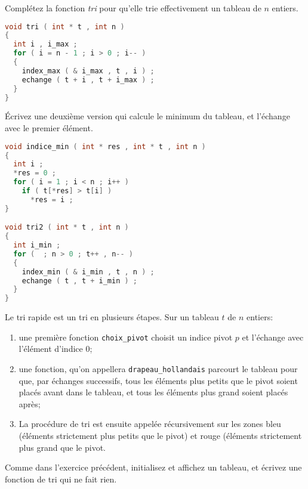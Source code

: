 \question Complétez la fonction \emph{tri} pour qu'elle trie
effectivement un tableau de \(n\) entiers.

\begin{solution}
  \begin{lstlisting}[language=C]
void tri ( int * t , int n )
{
  int i , i_max ;
  for ( i = n - 1 ; i > 0 ; i-- )
  {
    index_max ( & i_max , t , i ) ;
    echange ( t + i , t + i_max ) ;
  }
}
  \end{lstlisting}
\end{solution}

\question Écrivez une deuxième version qui calcule le minimum du
tableau, et l'échange avec le premier élément.

\begin{solution}
  \begin{lstlisting}[language=C]
void indice_min ( int * res , int * t , int n )
{
  int i ;
  *res = 0 ;
  for ( i = 1 ; i < n ; i++ )
    if ( t[*res] > t[i] )
      *res = i ;
}

void tri2 ( int * t , int n )
{
  int i_min ;
  for (  ; n > 0 ; t++ , n-- )
  {
    index_min ( & i_min , t , n ) ;
    echange ( t , t + i_min ) ;
  }
}
  \end{lstlisting}
\end{solution}


Le tri rapide est un tri en plusieurs étapes. Sur un tableau \(t\) de
\(n\) entiers:
\begin{enumerate}
\item une première fonction \texttt{choix\_pivot} choisit un indice
  pivot \(p\) et l'échange avec l'élément d'indice \(0\);
\item une fonction, qu'on appellera \texttt{drapeau\_hollandais}
  parcourt le tableau pour que, par échanges successifs, tous les
  éléments plus petits que le pivot soient placés avant dans le
  tableau, et tous les éléments plus grand soient placés après;
\item La procédure de tri est ensuite appelée récursivement sur les
  zones bleu (éléments strictement plus petits que le pivot) et rouge
  (éléments strictement plus grand que le pivot.
\end{enumerate}

\question Comme dans l'exercice précédent, initialisez et affichez un
tableau, et écrivez une fonction de tri qui ne fait rien.

